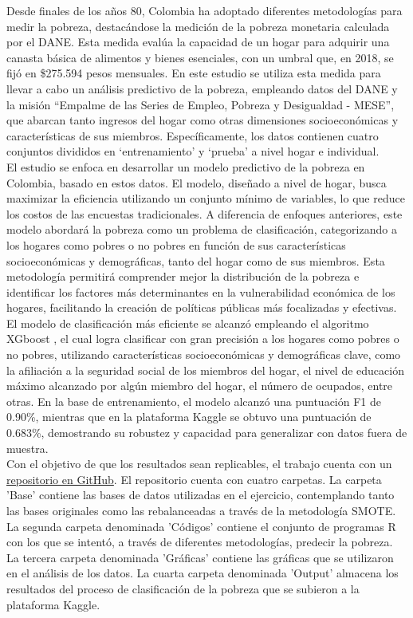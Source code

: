 \documentclass[a4paper]{article}
\theoremstyle{remark}
\theoremstyle{definition}
\begin{document}
Desde finales de los años 80, Colombia ha adoptado diferentes metodologías para medir la pobreza, destacándose la medición de la pobreza monetaria calculada por el DANE. Esta medida evalúa la capacidad de un hogar para adquirir una canasta básica de alimentos y bienes esenciales, con un umbral que, en 2018, se fijó en \$275.594 pesos mensuales. En este estudio se utiliza esta medida para llevar a cabo un análisis predictivo de la pobreza, empleando datos del DANE y la misión “Empalme de las Series de Empleo, Pobreza y Desigualdad - MESE”, que abarcan tanto ingresos del hogar como otras dimensiones socioeconómicas y características de sus miembros. Específicamente, los datos contienen cuatro conjuntos divididos en ‘entrenamiento’ y ‘prueba’ a nivel hogar e individual.\\

El estudio se enfoca en desarrollar un modelo predictivo de la pobreza en Colombia, basado en estos datos. El modelo, diseñado a nivel de hogar, busca maximizar la eficiencia utilizando un conjunto mínimo de variables, lo que reduce los costos de las encuestas tradicionales. A diferencia de enfoques anteriores, este modelo abordará la pobreza como un problema de clasificación, categorizando a los hogares como pobres o no pobres en función de sus características socioeconómicas y demográficas, tanto del hogar como de sus miembros. Esta metodología permitirá comprender mejor la distribución de la pobreza e identificar los factores más determinantes en la vulnerabilidad económica de los hogares, facilitando la creación de políticas públicas más focalizadas y efectivas. \\

El modelo de clasificación más eficiente se alcanzó empleando el algoritmo XGboost , el cual logra clasificar con gran precisión a los hogares como pobres o no pobres, utilizando características socioeconómicas y demográficas clave, como la afiliación a la seguridad social de los miembros del hogar, el nivel de educación máximo alcanzado por algún miembro del hogar, el número de ocupados, entre otras. En la base de entrenamiento, el modelo alcanzó una puntuación F1 de 0.90\%, mientras que en la plataforma Kaggle se obtuvo una puntuación de 0.683\%, demostrando su robustez y capacidad para generalizar con datos fuera de muestra.\\

Con el objetivo de que los resultados sean replicables, el trabajo cuenta con un \href{https://github.com/HenryC2/Problem-Set-2_Machine-Learning_2024.git}{repositorio en GitHub}. El repositorio cuenta con cuatro carpetas. La carpeta 'Base' contiene las bases de datos utilizadas en el ejercicio, contemplando tanto las bases originales como las rebalanceadas a través de la metodología SMOTE. La segunda carpeta denominada 'Códigos' contiene el conjunto de programas R con los que se intentó, a través de diferentes metodologías, predecir la pobreza. La tercera carpeta denominada 'Gráficas' contiene las gráficas que se utilizaron en el análisis de los datos. La cuarta carpeta denominada 'Output' almacena los resultados del proceso de clasificación de la pobreza que se subieron a la plataforma Kaggle. 
\end{document}
